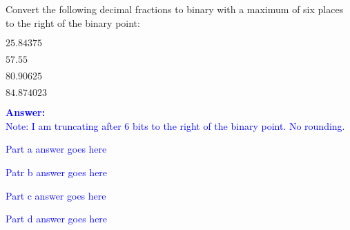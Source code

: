 \item{}
Convert the following decimal fractions to binary with a maximum of six places
to the right of the binary point:
\begin{list}{\textbf{}}{}
    \item $25.84375$
    \item $57.55$
    \item $80.90625$
    \item $84.874023$
\end{list}
\vskip12pt
\ifanswers
\textcolor{blue}{
\textbf{Answer:}\\
Note: I am truncating after 6 bits to the right of the binary point. No rounding.
\begin{list}{\textbf{}}{}
    \item Part a answer goes here
    \item Patr b answer goes here
    \item Part c answer goes here
    \item Part d answer goes here
\end{list}
}
\newpage
\fi
